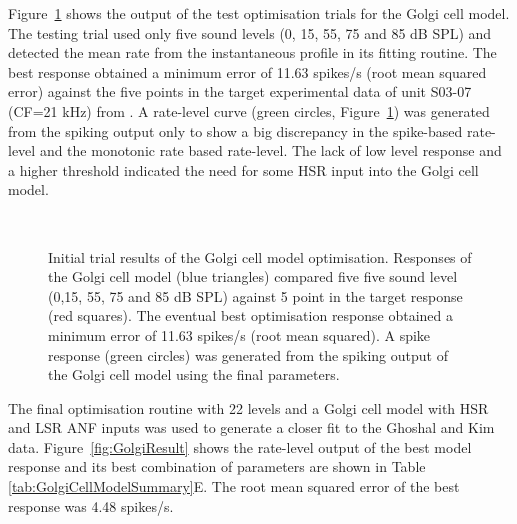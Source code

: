  Figure~\ref{fig:GolgiTestResult} shows the output of the test
 optimisation trials for the Golgi cell model.  The testing trial used
 only five sound levels (0, 15, 55, 75 and 85 dB SPL) and detected the
 mean rate from the instantaneous profile in its fitting routine. The
 best response obtained a minimum error of 11.63 spikes/s (root mean
 squared error) against the five points in the target experimental
 data of unit S03-07 (CF=21 kHz) from \citep{GhoshalKim:1996}. A
 rate-level curve (green circles, Figure~\ref{fig:GolgiTestResult})
 was generated from the spiking output only to show a big discrepancy
 in the spike-based rate-level and the monotonic rate based
 rate-level. The lack of low level response and a higher threshold
 indicated the need for some HSR input into the Golgi cell model.

\smallskip{}


\begin{figure}[htb]
  \centering
  \\
  \caption{Initial trial results of the Golgi cell model optimisation.
    Responses of the Golgi cell model (blue triangles) compared five five sound
    level (0,15, 55, 75 and 85 dB SPL) against 5 point in the target response
    (red squares). The eventual best optimisation response obtained a minimum
    error of 11.63 spikes/s (root mean squared). A spike response (green
    circles) was generated from the spiking output of the Golgi cell model using
    the final parameters.  }\label{fig:GolgiTestResult}
\end{figure}

The final optimisation routine with 22 levels and a Golgi cell model with HSR
and LSR ANF inputs was used to generate a closer fit to the Ghoshal and Kim
data. Figure~\ref{fig:GolgiResult} shows the rate-level output of the best model
response and its best combination of parameters are shown in Table
\ref{tab:GolgiCellModelSummary}E. The root mean squared error of the best
response was 4.48 spikes/s.

